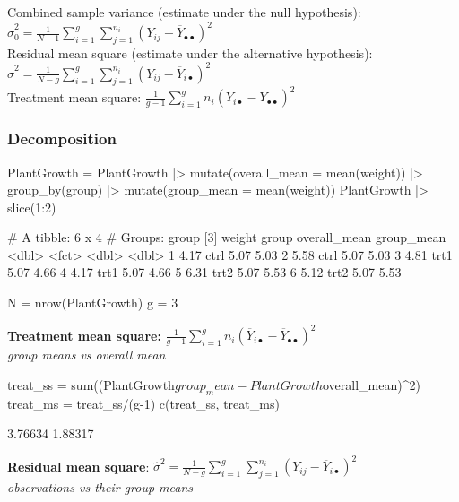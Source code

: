 \documentclass[a4paper]{article}\usepackage[]{graphicx}\usepackage[]{xcolor}
\begin{document}
Combined sample variance (estimate under the null hypothesis): \( \hat{\sigma}^2_0 = \frac{1}{N-1}\sum_{i=1}^g\sum_{j=1}^{n_i}(Y_{ij}-\overline Y_{\bullet\bullet})^2 \)\\
Residual mean square (estimate under the alternative hypothesis): \( \hat\sigma^2=\frac{1}{N-g}\sum_{i=1}^g\sum_{j=1}^{n_i}(Y_{ij}-\overline Y_{i\bullet})^2 \)\\
Treatment mean square: \( \frac{1}{g-1}\sum_{i=1}^g n_i (\overline Y_{i\bullet}-\overline Y_{\bullet\bullet})^2 \)
\subsubsection{Decomposition}
\begin{Schunk}
\begin{Sinput}
PlantGrowth = PlantGrowth |> 
  mutate(overall_mean = mean(weight)) |> 
  group_by(group) |> 
  mutate(group_mean = mean(weight))
PlantGrowth |> slice(1:2)
\end{Sinput}
\begin{Soutput}
# A tibble: 6 x 4
# Groups:   group [3]
  weight group overall_mean group_mean
   <dbl> <fct>        <dbl>      <dbl>
1   4.17 ctrl          5.07       5.03
2   5.58 ctrl          5.07       5.03
3   4.81 trt1          5.07       4.66
4   4.17 trt1          5.07       4.66
5   6.31 trt2          5.07       5.53
6   5.12 trt2          5.07       5.53
\end{Soutput}
\begin{Sinput}
N = nrow(PlantGrowth)
g = 3
\end{Sinput}
\end{Schunk}
\textbf{Treatment mean square:} \( \frac{1}{g-1}\sum_{i=1}^g n_i (\overline Y_{i\bullet}-\overline Y_{\bullet\bullet})^2 \)\\
\textit{group means vs overall mean}
\begin{Schunk}
\begin{Sinput}
treat_ss = sum((PlantGrowth$group_mean - PlantGrowth$overall_mean)^2)
treat_ms = treat_ss/(g-1)
c(treat_ss, treat_ms)
\end{Sinput}
\begin{Soutput}
[1] 3.76634 1.88317
\end{Soutput}
\end{Schunk}
\textbf{Residual mean square}: \( \hat\sigma^2=\frac{1}{N-g}\sum_{i=1}^g\sum_{j=1}^{n_i}(Y_{ij}-\overline Y_{i\bullet})^2 \)\\
\textit{observations vs their group means}
\end{document}
